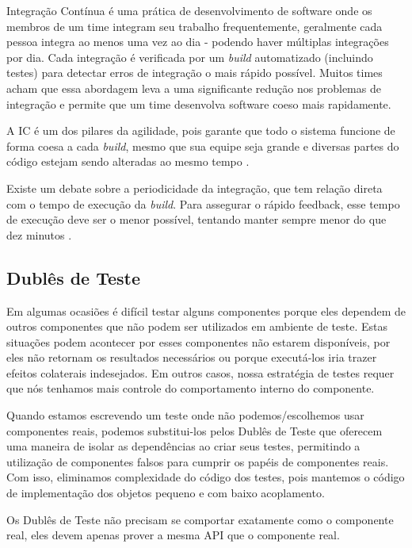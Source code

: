 \begin{citacao}
Integração Contínua é uma prática de desenvolvimento de software onde os membros de um time integram seu trabalho frequentemente, geralmente cada pessoa integra ao menos uma vez ao dia - podendo haver múltiplas integrações por dia. Cada integração é verificada por um \textit{build} automatizado (incluindo testes) para detectar erros de integração o mais rápido possível. Muitos times acham que essa abordagem leva a uma significante redução nos problemas de integração e permite que um time desenvolva software coeso mais rapidamente.
\end{citacao}

A IC é um dos pilares da agilidade, pois garante que todo o sistema funcione de forma coesa a cada \textit{build}, mesmo que sua equipe seja grande e diversas partes do código estejam sendo alteradas ao mesmo tempo \cite{CaelumCI}.

Existe um debate sobre a periodicidade da integração, que tem relação direta com o tempo de execução da \textit{build}. Para assegurar o rápido feedback, esse tempo de execução deve ser o menor possível, tentando manter sempre menor do que dez minutos \cite{FowlerCI}.


\subsection{Dublês de Teste}

Em algumas ocasiões é difícil testar alguns componentes porque eles dependem de outros componentes que não podem ser utilizados em ambiente de teste. Estas situações podem acontecer por esses componentes não estarem disponíveis, por eles não retornam os resultados necessários ou porque executá-los iria trazer efeitos colaterais indesejados. Em outros casos, nossa estratégia de testes requer que nós tenhamos mais controle do comportamento interno do componente.

Quando estamos escrevendo um teste onde não podemos/escolhemos usar componentes reais, podemos substitui-los pelos Dublês de Teste que oferecem uma maneira de isolar as dependências ao criar seus testes, permitindo a utilização de componentes falsos para cumprir os papéis de componentes reais. Com isso, eliminamos complexidade do código dos testes, pois mantemos o código de implementação dos objetos pequeno e com baixo acoplamento.

Os Dublês de Teste não precisam se comportar exatamente como o componente real, eles devem apenas prover a mesma API que o componente real.

